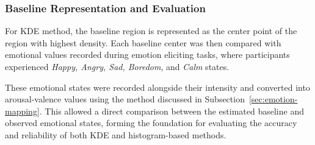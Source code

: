 




\subsubsection*{Baseline Representation and Evaluation}

\par For KDE method, the baseline region is represented as the center point of the region with highest density. Each baseline center was then compared with emotional values recorded during emotion eliciting tasks, where participants experienced \textit{Happy, Angry, Sad, Boredom}, and \textit{Calm} states.

\par These emotional states were recorded alongside their intensity and converted into arousal-valence values using the method discussed in Subsection~\ref{sec:emotion-mapping}. This allowed a direct comparison between the estimated baseline and observed emotional states, forming the foundation for evaluating the accuracy and reliability of both KDE and histogram-based methods.

